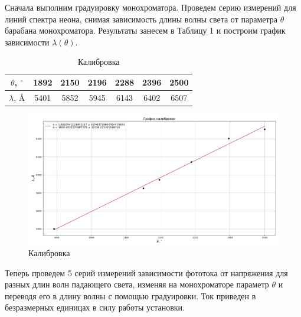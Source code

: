 \documentclass[a4paper,12pt]{article}
\theoremstyle{definition}
\begin{document}
	Сначала выполним градуировку монохроматора. Проведем серию измерений для линий спектра неона, снимая зависимость длины волны света от параметра $ \theta $ 
	барабана монохроматора. Результаты занесем в Таблицу 1 и построим график зависимости $ \lambda (\theta) $. 
	
	\begin{table}[h]
		\centering
		\caption{Калибровка}
		\begin{tabular}{|c|c|c|c|c|c|c|}
		\hline
		$\theta$, $^\circ$ & 1892 & 2150 & 2196 & 2288 & 2396 & 2500 \\ \hline
		$\lambda$, \AA     & 5401 & 5852 & 5945 & 6143 & 6402 & 6507 \\ \hline
		\end{tabular}
	\end{table}

	\begin{figure}[H]
		\centering
		\includegraphics[width = \textwidth]{colibrovka.png}
		\caption{Калибровка} 
	\end{figure}

	Теперь проведем 5 серий измерений зависимости фототока от напряжения для разных длин волн падающего света, изменяя на монохроматоре параметр $ \theta $ и переводя его в длину волны с помощью градуировки. Ток приведен в безразмерных единицах в силу работы установки. 
	
\end{document}
